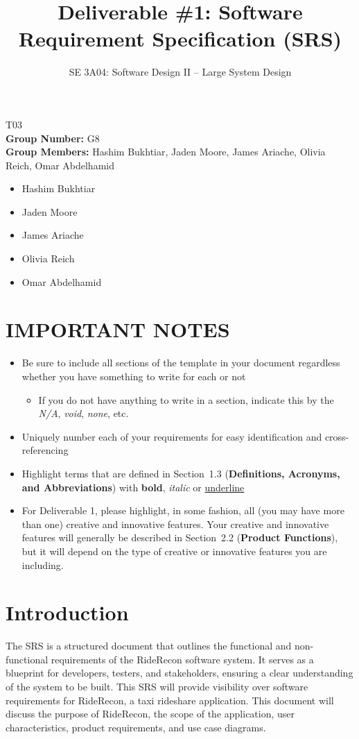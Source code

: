 \documentclass[]{article}
\title{Deliverable \#1: Software Requirement Specification (SRS)}
\author{SE 3A04: Software Design II -- Large System Design}
\date{}
\begin{document}
 

\maketitle	
{} T03\\
{\bf Group Number:} G8 \\
{\bf Group Members:} Hashim Bukhtiar, Jaden Moore, James Ariache, Olivia Reich, Omar Abdelhamid
\begin{itemize}
        \item Hashim Bukhtiar
        \item Jaden Moore
        \item James Ariache
        \item Olivia Reich
        \item Omar Abdelhamid
\end{itemize}

\section*{IMPORTANT NOTES}
\begin{itemize}
	\item Be sure to include all sections of the template in your document regardless whether you have something to write for each or not
	\begin{itemize}
		\item If you do not have anything to write in a section, indicate this by the \emph{N/A}, \emph{void}, \emph{none}, etc.
	\end{itemize}
	\item Uniquely number each of your requirements for easy identification and cross-referencing
	\item Highlight terms that are defined in Section~1.3 (\textbf{Definitions, Acronyms, and Abbreviations}) with \textbf{bold}, \emph{italic} or \underline{underline}
	\item For Deliverable 1, please highlight, in some fashion, all (you may have more than one) creative and innovative features. Your creative and innovative features will generally be described in Section~2.2 (\textbf{Product Functions}), but it will depend on the type of creative or innovative features you are including.
\end{itemize}

\newpage
\section{Introduction}
\label{sec:introduction}
The SRS is a structured document that outlines the functional and non-functional requirements of the RideRecon software system. It serves as a blueprint for developers, testers, and stakeholders, ensuring a clear understanding of the system to be built. This SRS will provide visibility over software requirements for RideRecon, a taxi rideshare application. 
This document will discuss the purpose of RideRecon, the scope of the application, user characteristics, product requirements, and use case diagrams.
\end{document}

